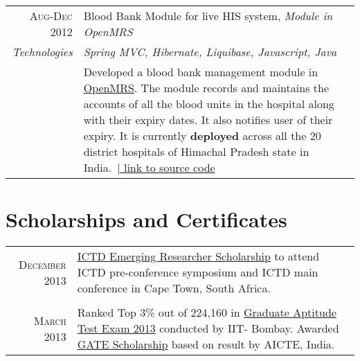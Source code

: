 \documentclass[a4paper,10pt]{article} %
\begin{document}
\begin{longtable}{r|p{13cm}}

\textsc{Aug-Dec 2012} & Blood Bank Module for live HIS system, \emph{Module in OpenMRS}\\
\emph{Technologies} & \emph{Spring MVC, Hibernate, Liquibase, Javascript, Java }\\ 
& \small{Developed a blood bank management module in \href{http://openmrs.org/}{OpenMRS}. The module records and maintains the accounts of all the blood units in the hospital along with their expiry dates. It also notifies user of their expiry. It is currently \textbf{deployed} across all the 20 district hospitals of Himachal Pradesh state in India.}\ \href{https://github.com/hispindia/bloodbank}{\hfill | link to source code}
\end{longtable}



\section{\color{red} Scholarships and Certificates}

\begin{tabular}{rp{13cm}}

\textsc{December} 2013 & \href{http://ictd.cs.uct.ac.za/attending-scholarships.html#preconference}{ICTD Emerging Researcher Scholarship} to attend ICTD  pre-conference symposium and ICTD main conference in Cape Town, South Africa. \normalsize\\ \\

\textsc{March} 2013 & Ranked Top 3\% out of 224,160 in \href{http://www.gate.iitb.ac.in/gate2013/}{Graduate Aptitude Test Exam 2013} conducted by IIT- Bombay. Awarded \href{http://www.aicte-india.org/generalInstructions.php}{GATE Scholarship} based on result by AICTE, India.\normalsize\\


\end{tabular}

\end{document}
